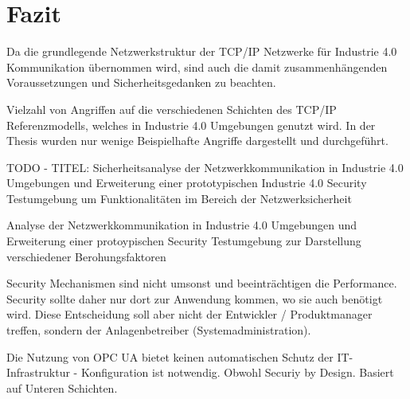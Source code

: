 \chapter{Fazit}
Da die grundlegende Netzwerkstruktur der \ac{TCP}/\ac{IP} Netzwerke für Industrie 4.0 Kommunikation übernommen wird, sind auch die damit zusammenhängenden Voraussetzungen und Sicherheitsgedanken zu beachten. \cite{sichKom2017}

Vielzahl von Angriffen auf die verschiedenen Schichten des \ac{TCP}/\ac{IP} Referenzmodells, welches in Industrie 4.0 Umgebungen genutzt wird.
In der Thesis wurden nur wenige Beispielhafte Angriffe dargestellt und durchgeführt.


TODO - TITEL:
Sicherheitsanalyse der Netzwerkkommunikation in Industrie 4.0 Umgebungen und Erweiterung einer prototypischen Industrie 4.0 Security Testumgebung um Funktionalitäten im Bereich der Netzwerksicherheit

Analyse der Netzwerkkommunikation in Industrie 4.0 Umgebungen und Erweiterung einer protoypischen Security Testumgebung zur Darstellung verschiedener Berohungsfaktoren

Security Mechanismen sind nicht umsonst und beeinträchtigen die Performance. Security sollte daher nur dort zur Anwendung kommen, wo sie auch benötigt wird. Diese Entscheidung soll aber nicht der Entwickler / Produktmanager treffen, sondern der Anlagenbetreiber (Systemadministration).

Die Nutzung von \ac{OPC UA} bietet keinen automatischen Schutz der IT-Infrastruktur - Konfiguration ist notwendig. Obwohl Securiy by Design. Basiert auf Unteren Schichten.